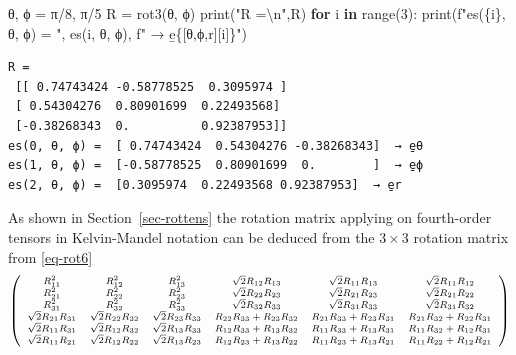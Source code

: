 \documentclass[
  letterpaper,
  DIV=11,
  numbers=noendperiod]{scrreprt}
\newenvironment{Shaded}{\begin{snugshade}}{\end{snugshade}}
\newcommand{\BuiltInTok}[1]{\textcolor[rgb]{0.00,0.23,0.31}{#1}}
\newcommand{\CharTok}[1]{\textcolor[rgb]{0.13,0.47,0.30}{#1}}
\newcommand{\ControlFlowTok}[1]{\textcolor[rgb]{0.00,0.23,0.31}{\textbf{#1}}}
\newcommand{\DecValTok}[1]{\textcolor[rgb]{0.68,0.00,0.00}{#1}}
\newcommand{\KeywordTok}[1]{\textcolor[rgb]{0.00,0.23,0.31}{\textbf{#1}}}
\newcommand{\NormalTok}[1]{\textcolor[rgb]{0.00,0.23,0.31}{#1}}
\newcommand{\OperatorTok}[1]{\textcolor[rgb]{0.37,0.37,0.37}{#1}}
\newcommand{\SpecialCharTok}[1]{\textcolor[rgb]{0.37,0.37,0.37}{#1}}
\newcommand{\SpecialStringTok}[1]{\textcolor[rgb]{0.13,0.47,0.30}{#1}}
\newcommand{\StringTok}[1]{\textcolor[rgb]{0.13,0.47,0.30}{#1}}
\begin{document}
\begin{Shaded}
\begin{Highlighting}[]
\NormalTok{θ, ϕ }\OperatorTok{=}\NormalTok{ π}\OperatorTok{/}\DecValTok{8}\NormalTok{, π}\OperatorTok{/}\DecValTok{5}
\NormalTok{R }\OperatorTok{=}\NormalTok{ rot3(θ, ϕ)}
\BuiltInTok{print}\NormalTok{(}\StringTok{"R =}\CharTok{\textbackslash{}n}\StringTok{"}\NormalTok{,R)}
\ControlFlowTok{for}\NormalTok{ i }\KeywordTok{in} \BuiltInTok{range}\NormalTok{(}\DecValTok{3}\NormalTok{): }\BuiltInTok{print}\NormalTok{(}\SpecialStringTok{f"es(}\SpecialCharTok{\{}\NormalTok{i}\SpecialCharTok{\}}\SpecialStringTok{, θ, ϕ) = "}\NormalTok{, es(i, θ, ϕ), }\SpecialStringTok{f" → e̱}\SpecialCharTok{\{}\NormalTok{[}\StringTok{\textquotesingle{}θ\textquotesingle{}}\NormalTok{,}\StringTok{\textquotesingle{}ϕ\textquotesingle{}}\NormalTok{,}\StringTok{\textquotesingle{}r\textquotesingle{}}\NormalTok{][i]}\SpecialCharTok{\}}\SpecialStringTok{"}\NormalTok{)}
\end{Highlighting}
\end{Shaded}

\begin{verbatim}
R =
 [[ 0.74743424 -0.58778525  0.3095974 ]
 [ 0.54304276  0.80901699  0.22493568]
 [-0.38268343  0.          0.92387953]]
es(0, θ, ϕ) =  [ 0.74743424  0.54304276 -0.38268343]  → e̱θ
es(1, θ, ϕ) =  [-0.58778525  0.80901699  0.        ]  → e̱ϕ
es(2, θ, ϕ) =  [0.3095974  0.22493568 0.92387953]  → e̱r
\end{verbatim}

As shown in Section~\ref{sec-rottens} the rotation matrix applying on
fourth-order tensors in Kelvin-Mandel notation can be deduced from the
\(3×3\) rotation matrix from \ref{eq-rot6} \[
\scriptsize
   \left(
\begin{array}{cccccc}
R_{1 1}^{2} & R_{1 2}^{2} & R_{1 3}^{2} & \sqrt{2}  R_{1 2}  R_{1 3} & \sqrt{2}  R_{1 1}  R_{1 3} & \sqrt{2}  R_{1 1}  R_{1 2} \\
R_{2 1}^{2} & R_{2 2}^{2} & R_{2 3}^{2} & \sqrt{2}  R_{2 2}  R_{2 3} & \sqrt{2}  R_{2 1}  R_{2 3} & \sqrt{2}  R_{2 1}  R_{2 2} \\
R_{3 1}^{2} & R_{3 2}^{2} & R_{3 3}^{2} & \sqrt{2}  R_{3 2}  R_{3 3} & \sqrt{2}  R_{3 1}  R_{3 3} & \sqrt{2}  R_{3 1}  R_{3 2} \\
\sqrt{2}  R_{2 1}  R_{3 1} & \sqrt{2}  R_{2 2}  R_{3 2} & \sqrt{2}  R_{2 3}  R_{3 3} & R_{2 2}  R_{3 3} + R_{2 3}  R_{3 2} & R_{2 1}  R_{3 3} + R_{2 3}  R_{3 1} & R_{2 1}  R_{3 2} + R_{2 2}  R_{3 1} \\
\sqrt{2}  R_{1 1}  R_{3 1} & \sqrt{2}  R_{1 2}  R_{3 2} & \sqrt{2}  R_{1 3}  R_{3 3} & R_{1 2}  R_{3 3} + R_{1 3}  R_{3 2} & R_{1 1}  R_{3 3} + R_{1 3}  R_{3 1} & R_{1 1}  R_{3 2} + R_{1 2}  R_{3 1} \\
\sqrt{2}  R_{1 1}  R_{2 1} & \sqrt{2}  R_{1 2}  R_{2 2} & \sqrt{2}  R_{1 3}  R_{2 3} & R_{1 2}  R_{2 3} + R_{1 3}  R_{2 2} & R_{1 1}  R_{2 3} + R_{1 3}  R_{2 1} & R_{1 1}  R_{2 2} + R_{1 2}  R_{2 1} \\
\end{array}
\right)
\]
\end{document}
